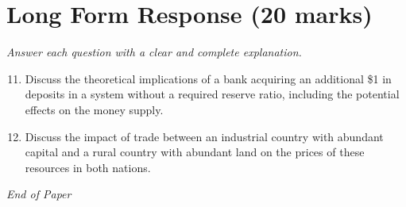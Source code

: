 \documentclass[12pt]{article}
\begin{document}
\section*{Long Form Response (20 marks)}
\textit{Answer each question with a clear and complete explanation.}
\begin{enumerate}[label=\arabic*.]
\setcounter{enumi}{10}
\item Discuss the theoretical implications of a bank acquiring an additional \$1 in deposits in a system without a required reserve ratio, including the potential effects on the money supply.
\item Discuss the impact of trade between an industrial country with abundant capital and a rural country with abundant land on the prices of these resources in both nations.
\end{enumerate}

\vfill
\noindent\textit{End of Paper}
\end{document}
